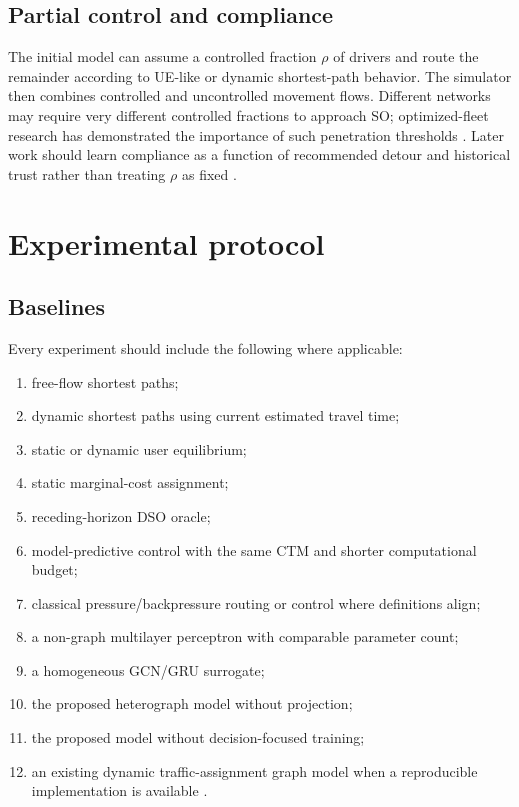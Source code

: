 \documentclass[11pt]{article}
\begin{document}
\subsection{Partial control and compliance}

The initial model can assume a controlled fraction \(\rho\) of drivers and route the
remainder according to UE-like or dynamic shortest-path behavior.  The simulator then
combines controlled and uncontrolled movement flows.  Different networks may require
very different controlled fractions to approach SO; optimized-fleet research has
demonstrated the importance of such penetration thresholds \citep{battifarano2023}.
Later work should learn compliance as a function of recommended detour and historical
trust rather than treating \(\rho\) as fixed \citep{jiang2024,yun2024}.

\section{Experimental protocol}

\subsection{Baselines}

Every experiment should include the following where applicable:

\begin{enumerate}[leftmargin=1.5em]
  \item free-flow shortest paths;
  \item dynamic shortest paths using current estimated travel time;
  \item static or dynamic user equilibrium;
  \item static marginal-cost assignment;
  \item receding-horizon DSO oracle;
  \item model-predictive control with the same CTM and shorter computational budget;
  \item classical pressure/backpressure routing or control where definitions align;
  \item a non-graph multilayer perceptron with comparable parameter count;
  \item a homogeneous GCN/GRU surrogate;
  \item the proposed heterograph model without projection;
  \item the proposed model without decision-focused training;
  \item an existing dynamic traffic-assignment graph model when a reproducible
  implementation is available \citep{liu2024hstgsn}.
\end{enumerate}
\end{document}

